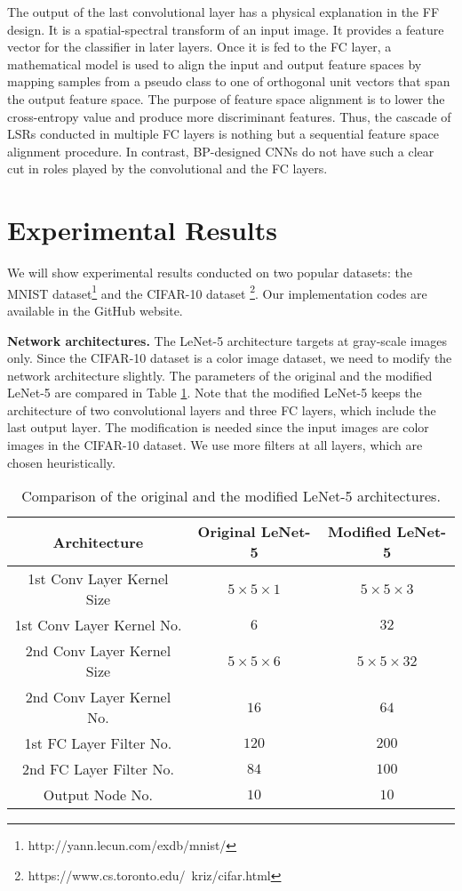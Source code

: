 \documentclass[preprint,12pt]{elsarticle}
\begin{document}
The output of the last convolutional layer has a physical explanation in
the FF design. It is a spatial-spectral transform of an input image. It
provides a feature vector for the classifier in later layers.  Once it
is fed to the FC layer, a mathematical model is used to align the input
and output feature spaces by mapping samples from a pseudo class to one
of orthogonal unit vectors that span the output feature space.  The
purpose of feature space alignment is to lower the cross-entropy value
and produce more discriminant features.  Thus, the cascade of LSRs
conducted in multiple FC layers is nothing but a sequential feature
space alignment procedure. In contrast, BP-designed CNNs do not have
such a clear cut in roles played by the convolutional and the FC layers. 

\section{Experimental Results}\label{sec:experiments}

We will show experimental results conducted on two popular datasets: the
MNIST dataset\footnote{http://yann.lecun.com/exdb/mnist/} and the
CIFAR-10 dataset \footnote{https://www.cs.toronto.edu/~kriz/cifar.html}. 
Our implementation codes are available in the GitHub website.

{\bf Network architectures.} The LeNet-5 architecture targets at
gray-scale images only. Since the CIFAR-10 dataset is a color image
dataset, we need to modify the network architecture slightly. The
parameters of the original and the modified LeNet-5 are compared in
Table \ref{table:mLeNet-5}. Note that the modified LeNet-5 keeps the
architecture of two convolutional layers and three FC layers, which
include the last output layer. The modification is needed since the
input images are color images in the CIFAR-10 dataset. We use more
filters at all layers, which are chosen heuristically. 

\begin{table}[htb]
\begin{center}
\begin{tabular}{|c|c|c|} \hline
Architecture     & Original LeNet-5  & Modified LeNet-5 \\ \hline
1st Conv Layer Kernel Size & $5 \times 5 \times 1$   &  $5 \times 5 \times 3$      \\ \hline
1st Conv Layer Kernel No.  & $6$  &  $32$     \\ \hline
2nd Conv Layer Kernel Size & $5 \times 5 \times 6$   &  $5 \times 5 \times 32$      \\ \hline
2nd Conv Layer Kernel No.  & $16$  & $64$  \\ \hline
1st FC Layer Filter No.    & $120$ & $200$ \\ \hline
2nd FC Layer Filter No.    & $84$  & $100$ \\ \hline
Output Node No.            & $10$  & $10$  \\ \hline
\end{tabular}
\end{center}
\caption{Comparison of the original and the modified LeNet-5
architectures.}\label{table:mLeNet-5}
\end{table}
\end{document}
